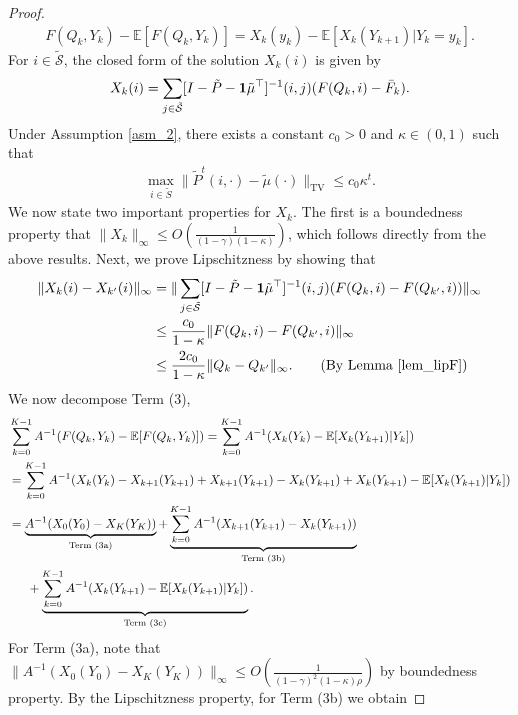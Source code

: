 \documentclass{opt2025} %
\begin{document}
\begin{proof}
\begin{align*}
F(Q_k, Y_k) - \mathbb{E}[F(Q_k, Y_k)] = X_k(y_k) - \mathbb{E}[X_k(Y_{k+1})| Y_{k}=y_k].
\end{align*}
For $i\in \tilde{\mathcal{S}}$, the closed form of the solution $X_k(i)$ is given by 
\begin{align*}
X_k(i) = \sum_{j\in \tilde{\mathcal{S}}} [I-\tilde{P}- {\bf{1}} \tilde{\mu}^{\top}]^{-1}(i,j)(F(Q_k,i)-\bar{F}_k).
\end{align*}
Under Assumption \ref{asm_2}, there exists a constant $c_0 >0 $ and $\kappa \in (0,1)$ such that 
\begin{align*}
\max_{i \in \tilde{S}}\| \tilde{P}^t(i,\cdot) - \tilde{\mu}(\cdot) \|_{\mathrm{TV}} \leq c_0 \kappa^t.
\end{align*}
We now state two important properties for $X_k$. The first is a boundedness property that $\|X_k\|_{\infty} \leq O(\frac{1}{(1-\gamma)(1-\kappa)})$, which follows directly from the above results. Next, we prove Lipschitzness by showing that
\begin{align*}
\| X_{k}(i) - X_{k^{\prime}}(i) \|_{\infty} &=  \| \sum_{j\in \tilde{\mathcal{S}}} [I-\tilde{P}- {\bf{1}} \tilde{\mu}^{\top}]^{-1}(i,j)(F(Q_k,i)-F(Q_{k^{\prime}},i)) \|_{\infty}\\
&\leq \frac{c_0}{1-\kappa} \| F(Q_k,i)-F(Q_{k^{\prime}},i) \|_{\infty}\\
&\leq \frac{2c_0}{1-\kappa} \| Q_k - Q_{k^{\prime}} \|_{\infty}. \tag{By Lemma \ref{lem_lipF}}
\end{align*}
We now decompose Term (3),
\begin{align*}
&\sum_{k=0}^{K-1} A^{-1} (F(Q_k, Y_k) - \mathbb{E}[F(Q_k, Y_k)])= \sum_{k=0}^{K-1} A^{-1} (X_k(Y_k) - \mathbb{E}[X_k(Y_{k+1})| Y_{k}])\\
&=\sum_{k=0}^{K-1} A^{-1} (X_k(Y_{k}) - X_{k+1}(Y_{k+1}) + X_{k+1}(Y_{k+1})  - X_{k}(Y_{k+1}) + X_{k}(Y_{k+1}) - \mathbb{E}[X_k(Y_{k+1})| Y_{k}])\\
&= \underbrace{A^{-1} (X_0(Y_{0}) - X_K(Y_{K}))}_{\text{Term (3a)}} + \underbrace{\sum_{k=0}^{K-1} A^{-1} ( X_{k+1}(Y_{k+1})  - X_{k}(Y_{k+1}))}_{\text{Term (3b)}} \\
&\indent + \underbrace{ \sum_{k=0}^{K-1} A^{-1}( X_{k}(Y_{k+1}) - \mathbb{E}[X_k(Y_{k+1})| Y_{k}])}_{\text{Term (3c)}}.
\end{align*}
For Term (3a), note that $\|A^{-1} (X_0(Y_{0}) - X_K(Y_{K}))\|_{\infty} \leq O(\frac{1}{(1-\gamma)^2(1-\kappa)\rho})$ by boundedness property. By the Lipschitzness property, for Term (3b) we obtain

\end{proof}
\end{document}

